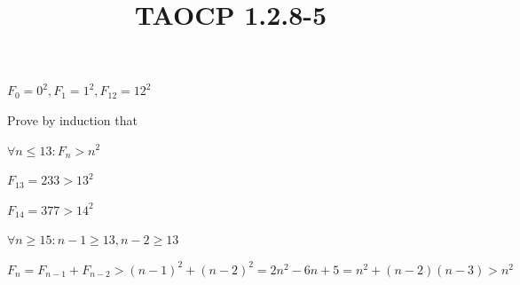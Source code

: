 \documentclass{article}
\title{TAOCP 1.2.8\mbox{-}5}
\begin{document}
\maketitle

\( F_{0} = 0^{2}, F_{1} = 1^{2}, F_{12} = 12^{2} \)

Prove by induction that

\( \forall n \leq 13: F_{n} > n^{2} \)

\( F_{13} = 233 > 13^{2} \)

\( F_{14} = 377 > 14^{2} \)

\( \forall n \geq 15: n - 1 \geq 13, n - 2 \geq 13 \)

\( F_{n} = F_{n-1} + F_{n-2} > {(n - 1)}^{2} + {(n - 2)}^{2} = 2n^{2}-6n+5 = n^{2} + (n-2)(n-3) > n^{2} \)
\end{document}
